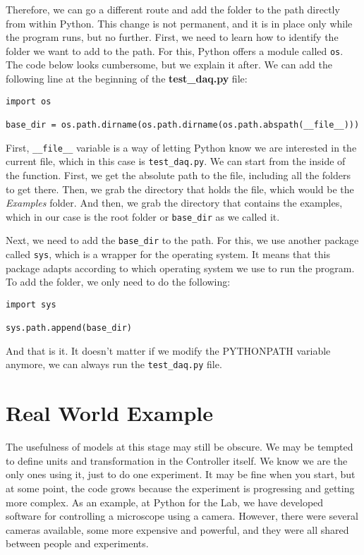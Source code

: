 Therefore, we can go a different route and add the folder to the path directly from within Python. This change is not permanent, and it is in place only while the program runs, but no further. First, we need to learn how to identify the folder we want to add to the path. For this, Python offers a module called \texttt{os}. The code below looks cumbersome, but we explain it after. We can add the following line at the beginning of the \textbf{test\_daq.py} file:

\begin{verbatim}
import os

base_dir = os.path.dirname(os.path.dirname(os.path.abspath(__file__)))
\end{verbatim}

First, \texttt{\_\_file\_\_} variable is a way of letting Python know we are interested in the current file, which in this case is \texttt{test\_daq.py}. We can start from the inside of the function. First, we get the absolute path to the file, including all the folders to get there. Then, we grab the directory that holds the file, which would be the \emph{Examples} folder. And then, we grab the directory that contains the examples, which in our case is the root folder or \texttt{base\_dir} as we called it.

Next, we need to add the \texttt{base\_dir} to the path. For this, we use another package called \texttt{sys}, which is a wrapper for the operating system. It means that this package adapts according to which operating system we use to run the program. To add the folder, we only need to do the following:

\begin{verbatim}
import sys

sys.path.append(base_dir)
\end{verbatim}

And that is it. It doesn't matter if we modify the PYTHONPATH variable anymore, we can always run the \texttt{test\_daq.py} file.


\section{Real World Example}\label{section:real-world-model}
The usefulness of models at this stage may still be obscure. We may be tempted to define units and transformation in the Controller itself. We know we are the only ones using it, just to do one experiment. It may be fine when you start, but at some point, the code grows because the experiment is progressing and getting more complex. As an example, at Python for the Lab, we have developed software for controlling a microscope using a camera. However, there were several cameras available, some more expensive and powerful, and they were all shared between people and experiments.

